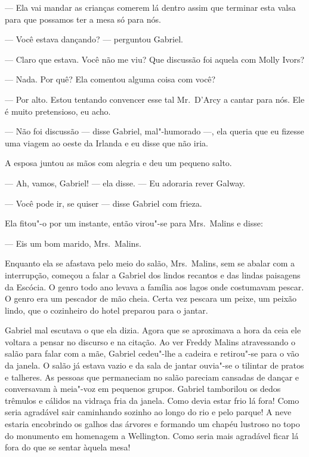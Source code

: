 --- Ela vai mandar as crianças comerem lá dentro assim que terminar esta valsa
para que possamos ter a mesa só para nós.

--- Você estava dançando? --- perguntou Gabriel.

--- Claro que estava.  Você não me viu?  Que discussão foi aquela com Molly
Ivors?

--- Nada.  Por quê?  Ela comentou alguma coisa com você?

--- Por alto.  Estou tentando convencer esse tal Mr.~D’Arcy a cantar para nós.
Ele é muito pretensioso, eu acho.

--- Não foi discussão --- disse Gabriel, mal"-humorado ---, ela queria que eu
fizesse uma viagem ao oeste da Irlanda e eu disse que não iria.

A esposa juntou as mãos com alegria e deu um pequeno salto.

--- Ah, vamos, Gabriel! --- ela disse.  --- Eu adoraria rever Galway.

--- Você pode ir, se quiser --- disse Gabriel com frieza.

Ela fitou"-o por um instante, então virou"-se para Mrs.~Malins e disse:

--- Eis um bom marido, Mrs.~Malins.

Enquanto ela se afastava pelo meio do salão, Mrs.~Malins, sem se abalar com a
interrupção, começou a falar a Gabriel dos lindos recantos e das lindas
paisagens da Escócia.  O genro todo ano levava a família aos lagos onde
costumavam pescar.  O genro era um pescador de mão cheia.  Certa vez pescara um
peixe, um peixão lindo, que o cozinheiro do hotel preparou para o jantar.

Gabriel mal escutava o que ela dizia.  Agora que se aproximava a hora da
ceia ele voltara a pensar no discurso e na citação.  Ao ver Freddy Malins
atravessando o salão para falar com a mãe, Gabriel cedeu"-lhe a cadeira e
retirou"-se para o vão da janela.  O salão já estava vazio e da sala de jantar
ouvia"-se o tilintar de pratos e talheres.  As pessoas que permaneciam no salão
pareciam cansadas de dançar e conversavam à meia"-voz em pequenos grupos.
Gabriel tamborilou os dedos trêmulos e cálidos na vidraça fria da janela.  Como
devia estar frio lá fora!  Como seria agradável sair caminhando sozinho ao
longo do rio e pelo parque!  A neve estaria encobrindo os galhos das árvores e
formando um chapéu lustroso no topo do monumento em homenagem a Wellington.
Como seria mais agradável ficar lá fora do que se sentar àquela mesa!

